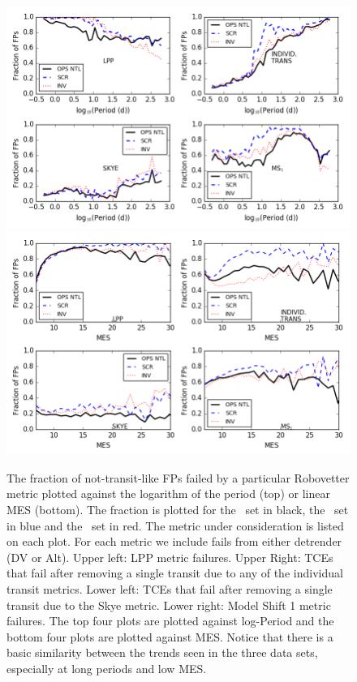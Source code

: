 \begin{figure}[ht]
    \centering
    \includegraphics[width=0.9\linewidth]{fig-fractionFailsByMetric.png}
    \includegraphics[width=0.9\linewidth]{fig-fractionFailsByMetricMes.png}
    \caption{The fraction of not-transit-like FPs failed by a particular Robovetter metric plotted against the logarithm of the period (top) or linear MES (bottom).  The fraction is plotted for the \opstce\ set in black, the \scrtce\ set in blue and the \invtce\ set in red. The metric under consideration is listed on each plot.  For each metric we include fails from either detrender (DV or Alt). Upper left: LPP metric failures. Upper Right: TCEs that fail after removing a single transit due to any of the individual transit metrics.  Lower left: TCEs that fail after removing a single transit due to the Skye metric. Lower right: Model Shift 1 metric failures. The top four plots are plotted against log-Period and the bottom four plots are plotted against MES. Notice that there is a basic similarity between the trends seen in the three data sets, especially at long periods and low MES.}
    \label{f:fractionFailMetric}
\end{figure}

